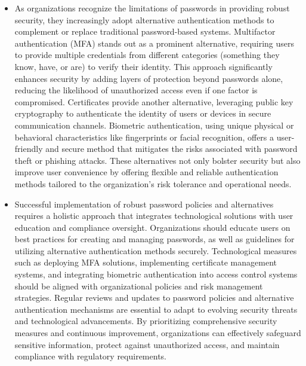 \documentclass{article}
\begin{document}
\begin{itemize}
	\item[] As organizations recognize the limitations of passwords in providing robust security, they increasingly adopt alternative authentication methods to complement or replace traditional password-based systems. Multifactor authentication (MFA) stands out as a prominent alternative, requiring users to provide multiple credentials from different categories (something they know, have, or are) to verify their identity. This approach significantly enhances security by adding layers of protection beyond passwords alone, reducing the likelihood of unauthorized access even if one factor is compromised. Certificates provide another alternative, leveraging public key cryptography to authenticate the identity of users or devices in secure communication channels. Biometric authentication, using unique physical or behavioral characteristics like fingerprints or facial recognition, offers a user-friendly and secure method that mitigates the risks associated with password theft or phishing attacks. These alternatives not only bolster security but also improve user convenience by offering flexible and reliable authentication methods tailored to the organization's risk tolerance and operational needs.
	\item[] Successful implementation of robust password policies and alternatives requires a holistic approach that integrates technological solutions with user education and compliance oversight. Organizations should educate users on best practices for creating and managing passwords, as well as guidelines for utilizing alternative authentication methods securely. Technological measures such as deploying MFA solutions, implementing certificate management systems, and integrating biometric authentication into access control systems should be aligned with organizational policies and risk management strategies. Regular reviews and updates to password policies and alternative authentication mechanisms are essential to adapt to evolving security threats and technological advancements. By prioritizing comprehensive security measures and continuous improvement, organizations can effectively safeguard sensitive information, protect against unauthorized access, and maintain compliance with regulatory requirements.
  

\end{itemize}
\end{document}
